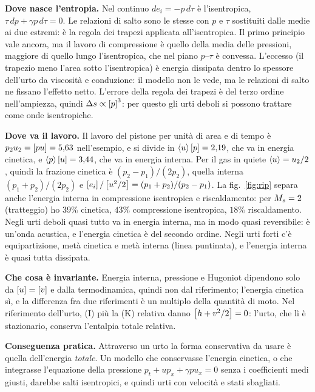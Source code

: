 \textbf{Dove nasce l'entropia.} Nel continuo $de_i=-p\,d\tau$ è l'isentropica, $\tau\,dp+\gamma p\,d\tau=0$. Le
relazioni di salto sono le stesse con $p$ e $\tau$ sostituiti dalle medie ai due estremi: è la regola dei trapezi
applicata all'isentropica. Il primo principio vale ancora, ma il lavoro di compressione è quello della media delle
pressioni, maggiore di quello lungo l'isentropica, che nel piano $p$--$\tau$ è convessa. L'eccesso (il trapezio
meno l'area sotto l'isentropica) è energia dissipata dentro lo spessore dell'urto da viscosità e conduzione: il
modello non le vede, ma le relazioni di salto ne fissano l'effetto netto. L'errore della regola dei trapezi è del
terzo ordine nell'ampiezza, quindi $\Delta s\propto\left[p\right]^3$: per questo gli urti deboli si possono trattare come
onde isentropiche.

\textbf{Dove va il lavoro.} Il lavoro del pistone per unità di area e di tempo è $p_2u_2=\left[pu\right]=5{,}63$
nell'esempio, e si divide in $\left\langle u\right\rangle\left[p\right]=2{,}19$, che va in energia cinetica, e $\left\langle p\right\rangle\left[u\right]=3{,}44$, che va in
energia interna. Per il gas in quiete $\left\langle u\right\rangle=u_2/2$, quindi la frazione cinetica è $(p_2-p_1)/(2p_2)$, quella
interna $(p_1+p_2)/(2p_2)$ e $\left[e_i\right]/\left[u^2/2\right]=(p_1+p_2)/(p_2-p_1)$. La fig.~\ref{fig:rip} separa anche
l'energia interna in compressione isentropica e riscaldamento: per $M_{s}=2$ (tratteggio) ho $39\%$ cinetica, $43\%$
compressione isentropica, $18\%$ riscaldamento. Negli urti deboli quasi tutto va in energia interna, ma in modo quasi
reversibile: è un'onda acustica, e l'energia cinetica è del secondo ordine. Negli urti forti c'è equipartizione,
metà cinetica e metà interna (linea puntinata), e l'energia interna è quasi tutta dissipata.

\textbf{Che cosa è invariante.} Energia interna, pressione e Hugoniot dipendono solo da $\left[u\right]=\left[v\right]$ e dalla
termodinamica, quindi non dal riferimento; l'energia cinetica sì, e la differenza fra due riferimenti è un multiplo
della quantità di moto. Nel riferimento dell'urto, (I) più la (K) relativa danno $\left[h+v^2/2\right]=0$: l'urto, che lì
è stazionario, conserva l'entalpia totale relativa.

\textbf{Conseguenza pratica.} Attraverso un urto la forma conservativa da usare è quella dell'energia
\emph{totale}. Un modello che conservasse l'energia cinetica, o che integrasse l'equazione della pressione
$p_t+up_x+\gamma pu_x=0$ senza i coefficienti medi giusti, darebbe salti isentropici, e quindi urti con velocità e
stati sbagliati.


